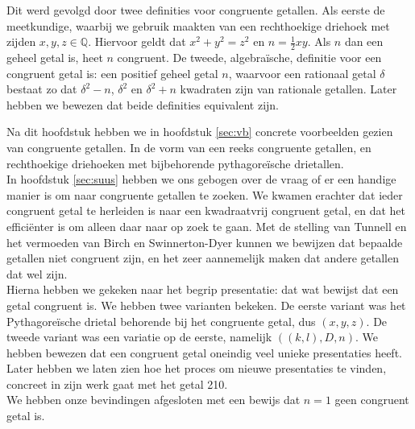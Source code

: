 \documentclass[12pt,reqno]{article}
\newcommand*{\QQ}{\ensuremath{\mathbb{Q}}}
\theoremstyle{theorem}
\theoremstyle{definition}
\begin{document}
	Dit werd gevolgd door twee definities voor congruente getallen. Als eerste de meetkundige, waarbij we gebruik maakten van een rechthoekige driehoek met zijden $x, y, z \in \QQ$. Hiervoor geldt dat $x^2+y^2=z^2$ en $n=\frac{1}{2}xy$. Als $n$ dan een geheel getal is, heet $n$ congruent. De tweede, algebra\"ische, definitie voor een congruent getal is: een positief geheel getal $n$, waarvoor een rationaal getal $\delta$ bestaat zo dat $\delta^2-n$, $\delta^2$ en $\delta^2+n$ kwadraten zijn van rationale getallen. Later hebben we bewezen dat beide definities equivalent zijn.
	
	Na dit hoofdstuk hebben we in hoofdstuk \ref{sec:vb} concrete voorbeelden gezien van congruente getallen. In de vorm van een reeks congruente getallen, en rechthoekige driehoeken met bijbehorende pythagore\"ische drietallen. \\
	
	In hoofdstuk \ref{sec:suus} hebben we ons gebogen over de vraag of er een handige manier is om naar congruente getallen te zoeken. We kwamen erachter dat ieder congruent getal te herleiden is naar een kwadraatvrij congruent getal, en dat het effici\"enter is om alleen daar naar op zoek te gaan. Met de stelling van Tunnell en het vermoeden van Birch en Swinnerton-Dyer kunnen we bewijzen dat bepaalde getallen niet congruent zijn, en het zeer aannemelijk maken dat andere getallen dat wel zijn.\\
	
	Hierna hebben we gekeken naar het begrip presentatie: dat wat bewijst dat een getal congruent is. We hebben twee varianten bekeken. De eerste variant was het Pythagore\"ische drietal behorende bij het congruente getal, dus $(x,y,z)$. De tweede variant was een variatie op de eerste, namelijk $((k,l),D,n)$. We hebben bewezen dat een congruent getal oneindig veel unieke presentaties heeft. Later hebben we laten zien hoe het proces om nieuwe presentaties te vinden, concreet in zijn werk gaat met het getal 210.\\
	
	We hebben onze bevindingen afgesloten met een bewijs dat $n=1$ geen congruent getal is.
	
	
	
	
\end{document}
